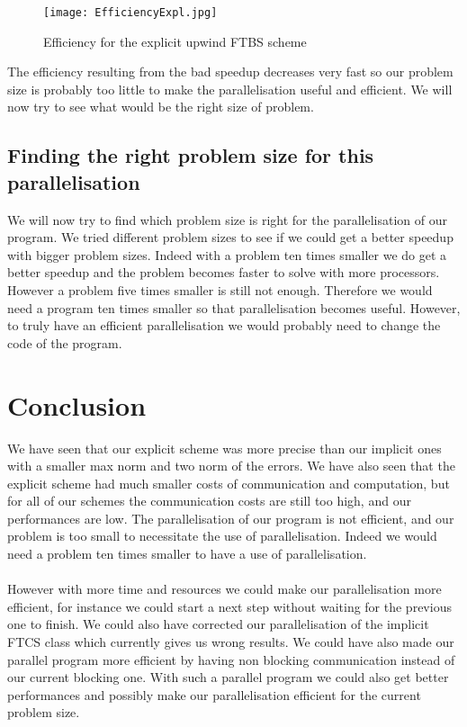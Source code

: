 \documentclass [10 pt, a4 paper]{report}
\begin{document}
\begin{figure}[!htbp]
\centering
\texttt{[image: EfficiencyExpl.jpg]}
\caption{\label{fig:image} Efficiency for the explicit upwind FTBS scheme}
\end{figure}
\noindent
The efficiency resulting from the bad speedup decreases very fast so our problem size is probably too little to make the parallelisation useful and efficient. We will now try to see what would be the right size of problem.

\section{Finding the right problem size for this parallelisation}
We will now try to find which problem size is right for the parallelisation of our program. We tried different problem sizes to see if we could get a better speedup with bigger problem sizes. Indeed with a problem ten times smaller we do get a better speedup and the problem becomes faster to solve with more processors. However a problem five times smaller is still not enough. Therefore we would need a program ten times smaller so that parallelisation becomes useful. However, to truly have an efficient parallelisation we would probably need to change the code of the program.




\chapter{Conclusion}
We have seen that our explicit scheme was more precise than our implicit ones with a smaller max norm and two norm of the errors. We have also seen that the explicit scheme had much smaller costs of communication and computation, but for all of our schemes the communication costs are still too high, and our performances are low. The parallelisation of our program is not efficient, and our problem is too small to necessitate the use of parallelisation. Indeed we would need a problem ten times smaller to have a use of parallelisation.
\\ \\
However with more time and resources we could make our parallelisation more efficient, for instance we could start a next step without waiting for the previous one to finish. We could also have corrected our parallelisation of the implicit FTCS class which currently gives us wrong results. We could have also made our parallel program more efficient by having non blocking communication instead of our current blocking one. With such a parallel program we could also get better performances and possibly make our parallelisation efficient for the current problem size.
\end{document}
